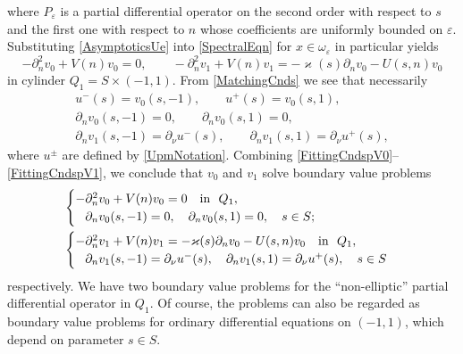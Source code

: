 \documentclass[reqno]{amsart}
\theoremstyle{plain}
\numberwithin{equation}{section}
\renewcommand{\kappa}{\varkappa}
\newcommand{\eps}{\varepsilon}
\newcommand{\pte}{\partial_n}
\begin{document}
where $P_\eps$ is a partial differential operator on the second order with respect to $s$ and the first one with respect to $n$ whose coefficients  are uniformly bounded on $\eps$.
Substituting \eqref{AsymptoticsUe} into \eqref{SpectralEqn} for $x\in \omega_\eps$ in particular yields
\begin{equation}\label{EqnsV0V1}
-\pte^2 v_0+V(n)v_0=0,
\qquad
-\pte^2 v_1+V(n)v_1=-\kappa(s)\pte v_0-U(s,n)v_0
\end{equation}
in cylinder $Q_1=S\times(-1,1)$.
From \eqref{MatchingCnds} we see that necessarily
\begin{gather}\label{FittingCndsUV0}
 u^-(s)=v_0(s,-1),\qquad u^+(s)=v_0(s,1),
 \\\label{FittingCndspV0}
 \partial_n v_0(s,- 1)=0, \qquad \partial_n v_0(s, 1)=0, \\\label{FittingCndspV1}
 \partial_n v_1(s, -1)=\partial_\nu u^-(s), \qquad
 \partial_n v_1(s, 1)=\partial_\nu u^+(s),
\end{gather}
where $u^\pm$ are defined by \eqref{UpmNotation}.
Combining \eqref{FittingCndspV0}--\eqref{FittingCndspV1}, we conclude that $v_0$ and $v_1$ solve boundary value problems
\begin{align}\label{problemV0}
&\begin{cases}
  -\pte^2 v_0+V(n)v_0=0 \quad \hbox{in \ } Q_1, \\
    \phantom{-}\partial_n v_0(s,- 1)=0, \quad \partial_n v_0(s, 1)=0, \quad s\in S;
\end{cases}
\\\label{problemV1}
&\begin{cases}
  -\pte^2 v_1+V(n)v_1=-\kappa(s)\pte v_0-U(s,n)v_0\quad \hbox{in \ } Q_1, \\
    \phantom{-}\partial_n v_1(s, -1)=\partial_\nu u^-(s), \quad
\partial_n v_1(s, 1)=\partial_\nu u^+(s), \quad s\in S
\end{cases}
\end{align}
respectively.
We have two boundary value problems for the ``non-ellip\-tic'' partial differential operator in $Q_1$. Of course,  the problems can also be  regarded as  boundary value problems for ordinary differential equations on $(-1,1)$, which depend on parameter $s\in S$.
\end{document}
